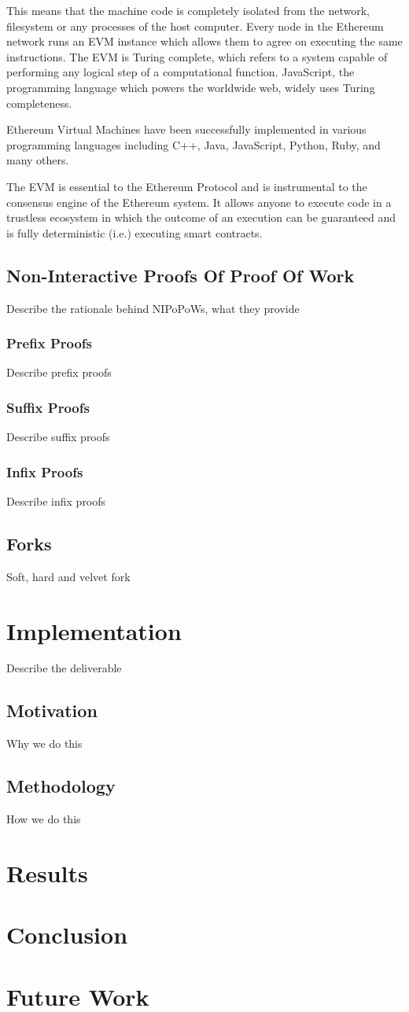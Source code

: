 \documentclass{article}
\begin{document}
This means that the machine code is completely isolated from the network, filesystem or any processes of the host computer. Every node in the Ethereum network runs an EVM instance which allows them to agree on executing the same instructions. The EVM is Turing complete, which refers to a system capable of performing any logical step of a computational function. JavaScript, the programming language which powers the worldwide web, widely uses Turing completeness.

Ethereum Virtual Machines have been successfully implemented in various programming languages including C++, Java, JavaScript, Python, Ruby, and many others.

The EVM is essential to the Ethereum Protocol and is instrumental to the consensus engine of the Ethereum system. It allows anyone to execute code in a trustless ecosystem in which the outcome of an execution can be guaranteed and is fully deterministic (i.e.) executing smart contracts.
\subsection{Non-Interactive Proofs Of Proof Of Work}
Describe the rationale behind NIPoPoWs, what they provide
\subsubsection{Prefix Proofs}
Describe prefix proofs
\subsubsection{Suffix Proofs}
Describe suffix proofs
\subsubsection{Infix Proofs}
Describe infix proofs
\subsection{Forks}
Soft, hard and velvet fork

\section{Implementation}
Describe the deliverable
\subsection{Motivation}
Why we do this
\subsection{Methodology}
How we do this

\section{Results}
\section{Conclusion}
\section{Future Work}
\end{document}
